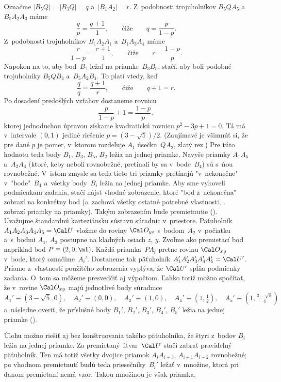 {Označme $|B_5Q|=|B_3Q|=q$ a~$|B_1A_2|=r$. Z~podobnosti trojuholníkov $B_5QA_5$ a~$B_5A_2A_3$ máme
$$
\frac qp=\frac{q+1}1,\qquad\text{čiže}\qquad q=\frac{p}{1-p}.
$$
Z~podobnosti trojuholníkov $B_1A_2A_1$ a~$B_1A_3A_4$ máme
$$
\frac r{1-p}=\frac{r+1}1,\qquad\text{čiže}\qquad r=\frac{1-p}p.
$$
Napokon na to, aby bod~$B_1$ ležal na priamke~$B_3B_5$, stačí, aby boli podobné trojuholníky $B_5QB_3$ a~$B_5A_2B_1$. To platí vtedy, keď
$$
\frac qq=\frac{q+1}r,\qquad\text{čiže}\qquad q+1=r.
$$
Po dosadení predošlých vzťahov dostaneme rovnicu
$$
  \frac{p}{1-p}+1=\frac{1-p}p,
$$
ktorej jednoduchou úpravou získame kvadratickú rovnicu $p^2-3p+1=0$. Tá má v~intervale $(0,1)$ jediné riešenie $p=(3-\sqrt5)/2$. (Zaujímavé je všimnúť si, že pre dané $p$ je pomer, v~ktorom rozdeľuje $A_1$ úsečku~$QA_2$, zlatý rez.) Pre túto hodnotu teda body $B_1$, $B_3$, $B_5$, $B_2$ ležia na jednej priamke. Navyše priamky $A_1A_5$ a~$A_2A_4$ (ktoré, keby neboli rovnobežné, pretínali by sa v~bode~$B_4$) sú s~ňou rovnobežné. V~istom zmysle sa teda tieto tri priamky pretínajú "v~nekonečne" v~"bode"~$B_4$ a~všetky body~$B_i$ ležia na jednej priamke. Aby sme vyhoveli podmienkam zadania, stačí nájsť vhodné zobrazenie, ktoré "bod z~nekonečna" zobrazí na konkrétny bod (a~zachová všetky ostatné potrebné vlastnosti, \tj. zobrazí priamky na priamky). Takým zobrazením bude premietnutie (\obr).
%
Uvažujme štandardnú karteziánsku sústavu súradníc v~priestore. Päťuholník $A_1A_2A_3A_4A_5=\Cal U$ vložme do roviny $\Cal O_{yz}$ s~bodom~$A_2$ v~počiatku a~s~bodmi $A_1$, $A_3$ postupne na kladných osiach $z$, $y$. Zvoľme ako premietací bod napríklad bod $P\equiv(2,0,\m1)$. Každá priamka~$PA_i$ pretne rovinu $\Cal O_{xy}$ v~bode, ktorý označíme~$A_i'$. Dostaneme tak päťuholník $A_1'A_2'A_3'A_4'A_5'=\Cal U'$. Priamo z~vlastností použitého zobrazenia vyplýva, že $\Cal U'$ spĺňa podmienky zadania. O~tom sa môžeme presvedčiť aj výpočtom. Ľahko totiž možno spočítať, že v~rovine $\Cal O_{xy}$ majú jednotlivé body súradnice
$$
  A_1'\equiv(3-\sqrt5,0),\quad A_2'\equiv(0,0),\quad A_3'\equiv(1,0),\quad
  A_4'\equiv(1,\tfrac12),\quad A_5'\equiv(1,\tfrac{3-\sqrt5}4) 
$$
a~následne overiť, že príslušné body $B_1'$, $B_2'$, $B_3'$, $B_4'$, $B_5'$ ležia na jednej priamke (\obr). 

\poznamka
Úlohu možno riešiť aj bez konštruovania takého päťuholníka, že štyri z~bodov $B_i$ ležia na jednej priamke. Za premietaný útvar~$\Cal U$ stačí zabrať pravidelný päťuholník. Ten má totiž všetky dvojice priamok $A_iA_{i+3}$, $A_{i+1}A_{i+2}$ rovnobežné; po vhodnom premietnutí budú teda priesečníky~$B_i'$ ležať v~množine, ktorá pri danom premietaní nemá vzor. Takou množinou je však priamka.}

